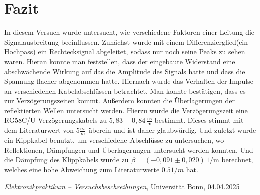 \documentclass{article}
\begin{document}

	\section{Fazit}

    In diesem Versuch wurde untersucht, wie verschiedene Faktoren einer Leitung die Signalausbreitung beeinflussen. 
    Zunächst wurde mit einem Differenzierglied(ein Hochpass) ein Rechtecksignal abgeleitet, sodass nur noch seine 
    Peaks zu sehen waren. Hieran konnte man feststellen, dass der eingebaute Widerstand eine abschwächende Wirkung auf 
    das die Amplitude des Signals hatte und dass die Spannung flacher abgenommen hatte. Hiernach wurde das Verhalten 
    der Impulse an verschiedenen Kabelabschlüssen betrachtet.  Man konnte bestätigen, dass es zur Verzögerungszeiten 
    kommt. Außerdem konnten die Überlagerungen der reflektierten Wellen untersucht werden. Hierzu wurde die 
    Verzögerungszeit eine RG58C/U-Verzögerungskabels zu $ 5{,}83\pm 0{,}84\,\frac{\text{ns}}{\text{m}}$ bestimmt. Dieses stimmt mit dem Literaturwert 
    von $5 \frac{ns}{m}$ überein und ist daher glaubwürdig. Und zuletzt wurde ein Kippkabel benutzt, um verschiedene
     Abschlüsse zu untersuchen, wo Reflektionen, Dämpfungen und Überlagerungen untersucht werden konnten. 
     Und die Dämpfung des Klippkabels wurde zu $\beta = (-0{,}091 \pm 0{,}020)\,\text{1/m}$ berechnet, welches eine hohe Abweichung
      zum Literaturwerte $0.5 1/m$ hat. 
        \begin{thebibliography}{9}
        
        \textit{Elektronikpraktikum -- Versuchsbeschreibungen}, Universität Bonn, 04.04.2025
        
        
        \end{thebibliography}
\end{document}
